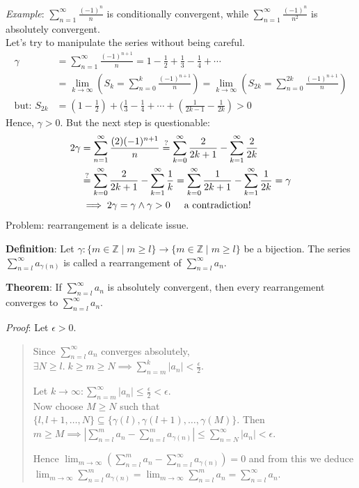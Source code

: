 \documentclass[11pt]{article}
\newcommand{\qeq}{\stackrel{?}{=}}
\begin{document}
\emph{Example}: $\sum_{n=1}^\infty \frac{(-1)^n}{n}$ is conditionally convergent, while $\sum_{n=1}^\infty \frac{(-1)^n}{n^2}$ is absolutely convergent.\\

Let's try to manipulate the series without being careful.
\begin{align*}
\gamma &= \sum_{n=1}^\infty \frac{(-1)^{n+1}}{n} = 1 - \frac{1}{2} + \frac{1}{3} - \frac{1}{4} + \cdots\\
&= \lim_{k \to \infty} (S_k = \sum_{n=0}^k \frac{(-1)^{n+1}}{n}) = \lim_{k \to \infty} (S_{2k} = \sum_{n=0}^{2k} \frac{(-1)^{n+1}}{n})\\
\text{but: } S_{2k} &= (1-\frac{1}{2}) + (\frac{1}{3} - \frac{1}{4} + \cdots + (\frac{1}{2k-1} - \frac{1}{2k}) > 0
\end{align*}
Hence, $\gamma > 0$. But the next step is questionable:
\begin{align*}
2\gamma &= \sum_{n=1}^\infty \frac{(2)(-1)^{n+1}}{n} \qeq \sum_{k=0}^\infty \frac{2}{2k+1} - \sum_{k=1}^\infty \frac{2}{2k}\\
&\qeq \sum_{k=0}^\infty \frac{2}{2k+1} - \sum_{k=1}^\infty \frac{1}{k} = \sum_{k=0}^\infty \frac{1}{2k+1} - \sum_{k=1}^\infty \frac{1}{2k} = \gamma\\
&\implies 2\gamma = \gamma \land \gamma > 0 \hspace{0.5cm} \text{a contradiction!}
\end{align*}
Problem: rearrangement is a delicate issue.

\textbf{Definition}: Let $\gamma : \{m \in \mathbb{Z} \;|\; m \geq l\} \to \{m \in \mathbb{Z} \;|\; m \geq l\}$ be a bijection. The series $\sum_{n=l}^\infty a_{\gamma(n)}$ is called a rearrangement of $\sum_{n=l}^\infty a_n$.

\textbf{Theorem}: If $\sum_{n=l}^\infty a_n$ is absolutely convergent, then every rearrangement converges to $\sum_{n=l}^\infty a_n$.

\emph{Proof}: Let $\epsilon > 0$.
\begin{quote}
Since $\sum_{n=l}^\infty a_n$ converges absolutely, $\exists N \geq l.\; k \geq m \geq N \implies \sum_{n=m}^k |a_n| < \frac{\epsilon}{2}$.

Let $k \to \infty : \sum_{n=m}^\infty |a_n| \leq \frac{\epsilon}{2} < \epsilon$.\\
Now choose $M \geq N$ such that $\{l, l+1, \ldots, N\} \subseteq \{\gamma(l), \gamma(l+1), \ldots, \gamma(M)\}$. Then $m \geq M \implies |\sum_{n=l}^m a_n - \sum_{n=l}^m a_{\gamma(n)}| \leq \sum_{n=N}^\infty |a_n| < \epsilon$.

Hence $\lim_{m \to \infty} (\sum_{n=l}^m a_n - \sum_{n=l}^\infty a_{\gamma(n)}) = 0$ and from this we deduce\\
$\lim_{m \to \infty} \sum_{n=l}^m a_{\gamma(n)} = \lim_{m \to \infty} \sum_{n=l}^m a_n = \sum_{n=l}^\infty a_n$.
\end{quote}
\end{document}
